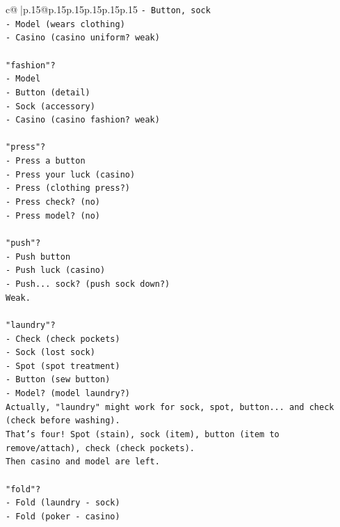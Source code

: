 \documentclass{article}
\begin{document}
{\begin{supertabular}{c@{$\;$}|p{.15\linewidth}@{}p{.15\linewidth}p{.15\linewidth}p{.15\linewidth}p{.15\linewidth}p{.15\linewidth}}
{{{\texttt{{-} Button, sock} \\
\texttt{{-} Model (wears clothing)} \\
\texttt{{-} Casino (casino uniform? weak)} \\
\\ 
\texttt{"fashion"?} \\
\texttt{{-} Model} \\
\texttt{{-} Button (detail)} \\
\texttt{{-} Sock (accessory)} \\
\texttt{{-} Casino (casino fashion? weak)} \\
\\ 
\texttt{"press"?} \\
\texttt{{-} Press a button} \\
\texttt{{-} Press your luck (casino)} \\
\texttt{{-} Press (clothing press?)} \\
\texttt{{-} Press check? (no)} \\
\texttt{{-} Press model? (no)} \\
\\ 
\texttt{"push"?} \\
\texttt{{-} Push button} \\
\texttt{{-} Push luck (casino)} \\
\texttt{{-} Push... sock? (push sock down?)} \\
\texttt{Weak.} \\
\\ 
\texttt{"laundry"?} \\
\texttt{{-} Check (check pockets)} \\
\texttt{{-} Sock (lost sock)} \\
\texttt{{-} Spot (spot treatment)} \\
\texttt{{-} Button (sew button)} \\
\texttt{{-} Model? (model laundry?)} \\
\texttt{Actually, "laundry" might work for sock, spot, button... and check (check before washing).} \\
\texttt{That's four! Spot (stain), sock (item), button (item to remove/attach), check (check pockets).} \\
\texttt{Then casino and model are left.} \\
\\ 
\texttt{"fold"?} \\
\texttt{{-} Fold (laundry {-} sock)} \\
\texttt{{-} Fold (poker {-} casino)} \\
}}}
\end{supertabular}}
\end{document}
